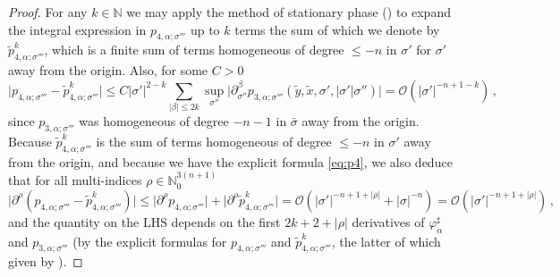 \documentclass[11pt]{amsart}
\theoremstyle{definition}
\numberwithin{equation}{section}
\newcommand{\abs}[1]{\lvert #1 \rvert}          %
\newcommand{\p}{\partial}
\begin{document}
\begin{proof}
    For any $k\in\mathbb{N}$ we may apply the method of stationary phase (\cite[Thm.~7.7.6]{hoermander1}) to expand the integral expression in $p_{4,\alpha;\sigma'''}$ up to $k$ terms the sum of which we denote by $\tilde{p}^k_{4,\alpha;\sigma'''}$, which is a finite sum of terms homogeneous of degree $\leq -n$ in $\sigma'$ for $\sigma'$ away from the origin. Also, for some $C>0$
    \begin{equation}\label{eq:O1}
        \abs{p_{4,\alpha;\sigma'''}-\tilde{p}^k_{4,\alpha;\sigma'''}} \leq C\abs{\sigma'}^{2-k}\sum_{\abs{\beta}\leq 2k}\sup_{\sigma''}\abs{\p^\beta_{\sigma''} p_{3,\alpha;\sigma'''}(\tilde{y},\tilde{x},\sigma',\abs{\sigma'}\sigma'')} = \mathcal{O}(\abs{\sigma'}^{-n+1-k})\,,
    \end{equation}
    since $p_{3,\alpha;\sigma'''}$ was homogeneous of degree $-n-1$ in $\bar\sigma$ away from the origin. 
    Because $\tilde{p}^k_{4,\alpha;\sigma'''}$ is the sum of terms homogeneous of degree $\leq -n$ in $\sigma'$ away from the origin, and because we have the explicit formula \eqref{eq:p4}, we also deduce that for all multi-indices $\rho \in \mathbb{N}_0^{3(n+1)}$
    \begin{equation}\label{eq:O2}
        \abs{\partial^\rho(p_{4,\alpha;\sigma'''}-\tilde{p}^k_{4,\alpha;\sigma'''})} \leq \abs{\partial^\rho p_{4,\alpha;\sigma'''}}+\abs{\partial^\rho \tilde{p}^k_{4,\alpha;\sigma'''}} = \mathcal{O}(\abs{\sigma'}^{-n+1+\abs{\rho}}+\abs{\sigma}^{-n}) = \mathcal{O}(\abs{\sigma'}^{-n+1+\abs{\rho}})\,,
    \end{equation}
    and the quantity on the LHS depends on the first $2k+2+\abs{\rho}$ derivatives of $\varphi_\alpha^\sharp$ and $p_{3,\alpha;\sigma'''}$ (by the explicit formulas for $p_{4,\alpha;\sigma'''}$ and $\tilde{p}^k_{4,\alpha;\sigma'''}$, the latter of which given by \cite[Thm.~7.7.6]{hoermander1}).


\end{proof}
\end{document}
